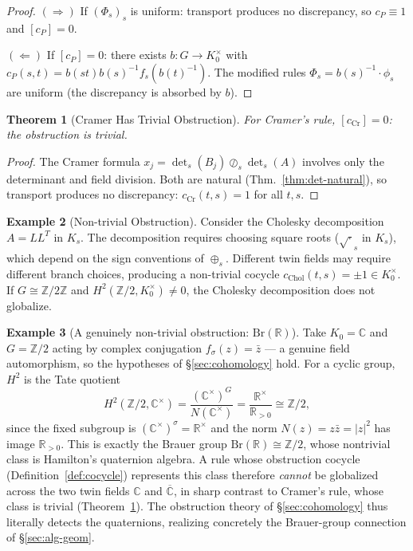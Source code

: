 \documentclass[11pt,twocolumn]{article}
\theoremstyle{plain}
\newtheorem{theorem}{Theorem}
\theoremstyle{definition}
\newtheorem{example}[theorem]{Example}
\theoremstyle{remark}
\begin{document}
\begin{proof}
$(\Rightarrow)$ If $(\Phi_s)_s$ is uniform: transport produces no discrepancy, so $c_P \equiv 1$ and $[c_P] = 0$.

$(\Leftarrow)$ If $[c_P] = 0$: there exists $b: G \to K_0^\times$ with $c_P(s,t) = b(st) b(s)^{-1} f_s(b(t)^{-1})$. The modified rules $\Phi_s = b(s)^{-1} \cdot \phi_s$ are uniform (the discrepancy is absorbed by $b$).
\end{proof}

\begin{theorem}[Cramer Has Trivial Obstruction]\label{thm:cramer-trivial}
For Cramer's rule, $[c_{\mathrm{Cr}}] = 0$: the obstruction is trivial.
\end{theorem}

\begin{proof}
The Cramer formula $x_j = \det_s(B_j) \oslash_s \det_s(A)$ involves only the determinant and field division. Both are natural (Thm.~\ref{thm:det-natural}), so transport produces no discrepancy: $c_{\mathrm{Cr}}(t,s) = 1$ for all $t, s$.
\end{proof}

\begin{example}[Non-trivial Obstruction]
Consider the Cholesky decomposition $A = L L^T$ in $K_s$. The decomposition requires choosing square roots ($\sqrt{\cdot}_s$ in $K_s$), which depend on the sign conventions of $\oplus_s$. Different twin fields may require different branch choices, producing a non-trivial cocycle $c_{\mathrm{Chol}}(t,s) = \pm 1 \in K_0^\times$. If $G \cong \mathbb{Z}/2\mathbb{Z}$ and $H^2(\mathbb{Z}/2, K_0^\times) \neq 0$, the Cholesky decomposition does not globalize.
\end{example}


\begin{example}[A genuinely non-trivial obstruction: $\mathrm{Br}(\mathbb{R})$]\label{ex:brauer-z2}
Take $K_0=\mathbb{C}$ and $G=\mathbb{Z}/2$ acting by complex conjugation $f_\sigma(z)=\bar z$ --- a genuine field
automorphism, so the hypotheses of \S\ref{sec:cohomology} hold. For a cyclic group, $H^2$ is the Tate quotient
\[
H^2(\mathbb{Z}/2,\mathbb{C}^\times)=\frac{(\mathbb{C}^\times)^{G}}{N(\mathbb{C}^\times)}=\frac{\mathbb{R}^\times}{\mathbb{R}_{>0}}\cong\mathbb{Z}/2,
\]
since the fixed subgroup is $(\mathbb{C}^\times)^\sigma=\mathbb{R}^\times$ and the norm $N(z)=z\bar z=|z|^2$ has image
$\mathbb{R}_{>0}$. This is exactly the Brauer group $\mathrm{Br}(\mathbb{R})\cong\mathbb{Z}/2$, whose nontrivial class
is Hamilton's quaternion algebra. A rule whose obstruction cocycle (Definition~\ref{def:cocycle}) represents this
class therefore \emph{cannot} be globalized across the two twin fields $\mathbb{C}$ and $\overline{\mathbb{C}}$,
in sharp contrast to Cramer's rule, whose class is trivial (Theorem~\ref{thm:cramer-trivial}). The obstruction
theory of \S\ref{sec:cohomology} thus literally detects the quaternions, realizing concretely the Brauer-group
connection of \S\ref{sec:alg-geom}.
\end{example}
\end{document}
